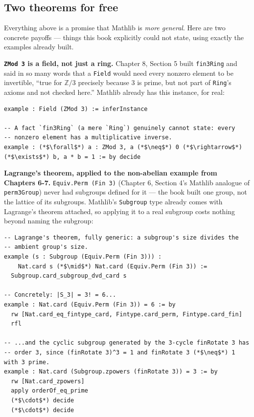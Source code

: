 \subsection{Two theorems for free}\label{sec:13-next-steps:02-moving-to-mathlib:2}

Everything above is a promise that Mathlib is \emph{more general}. Here are two concrete payoffs --- things this book explicitly could not state, using exactly the examples already built.

\textbf{\texttt{ZMod 3} is a field, not just a ring.} Chapter 8, Section 5 built \texttt{fin3Ring} and said in so many words that a \texttt{Field} would need every nonzero element to be invertible, ``true for \(\mathbb{Z}/3\) precisely because \(3\) is prime, but not part of \texttt{Ring}'s axioms and not checked here.'' Mathlib already has this instance, for real:

\begin{lstlisting}
example : Field (ZMod 3) := inferInstance

-- A fact `fin3Ring` (a mere `Ring`) genuinely cannot state: every
-- nonzero element has a multiplicative inverse.
example : (*$\forall$*) a : ZMod 3, a (*$\neq$*) 0 (*$\rightarrow$*) (*$\exists$*) b, a * b = 1 := by decide
\end{lstlisting}

\textbf{Lagrange's theorem, applied to the non-abelian example from Chapters 6-7.} \texttt{Equiv.Perm (Fin 3)} (Chapter 6, Section 4's Mathlib analogue of \texttt{perm3Group}) never had subgroups defined for it --- the book built one group, not the lattice of its subgroups. Mathlib's \texttt{Subgroup} type already comes with Lagrange's theorem attached, so applying it to a real subgroup costs nothing beyond naming the subgroup:

\begin{lstlisting}
-- Lagrange's theorem, fully generic: a subgroup's size divides the
-- ambient group's size.
example (s : Subgroup (Equiv.Perm (Fin 3))) :
    Nat.card s (*$\mid$*) Nat.card (Equiv.Perm (Fin 3)) :=
  Subgroup.card_subgroup_dvd_card s

-- Concretely: |S_3| = 3! = 6...
example : Nat.card (Equiv.Perm (Fin 3)) = 6 := by
  rw [Nat.card_eq_fintype_card, Fintype.card_perm, Fintype.card_fin]
  rfl

-- ...and the cyclic subgroup generated by the 3-cycle finRotate 3 has
-- order 3, since (finRotate 3)^3 = 1 and finRotate 3 (*$\neq$*) 1 with 3 prime.
example : Nat.card (Subgroup.zpowers (finRotate 3)) = 3 := by
  rw [Nat.card_zpowers]
  apply orderOf_eq_prime
  (*$\cdot$*) decide
  (*$\cdot$*) decide
\end{lstlisting}

